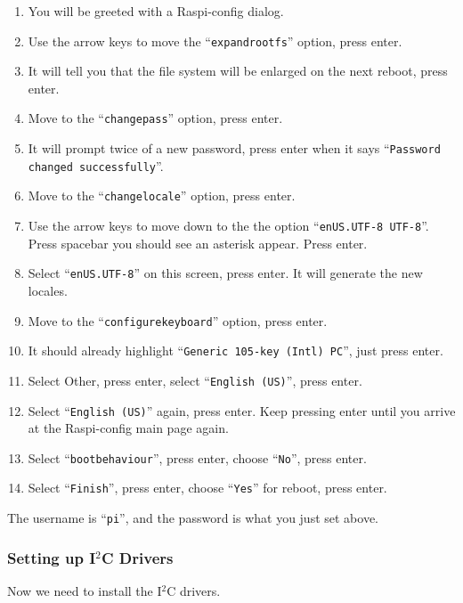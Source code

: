 \documentclass{article}
\begin{document}
\begin{enumerate}
    \item You will be greeted with a Raspi-config dialog.
    \item Use the arrow keys to move the ``{\tt expand\textunderscore rootfs}'' option, press enter.
    \item It will tell you that the file system will be enlarged on the next reboot, press enter.
    \item Move to the ``{\tt change\textunderscore pass}'' option, press enter.
    \item It will prompt twice of a new password, press enter when it says ``{\tt Password changed successfully}''.
    \item Move to the ``{\tt change\textunderscore locale}'' option, press enter.
    \item Use the arrow keys to move down to the the option ``{\tt en\textunderscore US.UTF-8 UTF-8}''. Press spacebar you should see an asterisk appear. Press enter.
    \item Select ``{\tt en\textunderscore US.UTF-8}'' on this screen, press enter. It will generate the new locales.
    \item Move to the ``{\tt configure\textunderscore keyboard}'' option, press enter.
    \item It should already highlight ``{\tt Generic 105-key (Intl) PC}'', just press enter.
    \item Select Other, press enter, select ``{\tt English (US)}'', press enter.
    \item Select ``{\tt English (US)}'' again, press enter. Keep pressing enter until you arrive at the Raspi-config main page again.
    \item Select ``{\tt boot\textunderscore behaviour}'', press enter, choose ``{\tt No}'', press enter.
    \item Select ``{\tt Finish}'', press enter, choose ``{\tt Yes}'' for reboot, press enter.
 \end{enumerate}

The username is ``{\tt pi}'', and the password is what you just set above.

\subsubsection{Setting up I$^2$C Drivers}
Now we need to install the I$^2$C drivers.
\end{document}
